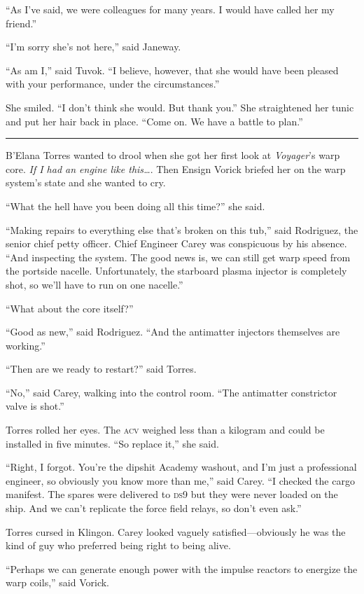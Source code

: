 \documentclass[twoside,letterpaper,12pt]{memoir}
\begin{document}
``As I've said, we were colleagues for many years. I would have called her my friend.''

``I'm sorry she's not here,'' said Janeway.

``As am I,'' said Tuvok. ``I believe, however, that she would have been pleased with your performance, under the circumstances.''

She smiled. ``I don't think she would. But thank you.'' She straightened her tunic and put her hair back in place. ``Come on. We have a battle to plan.''

\fancybreak{\rule{3cm}{0.4 pt}}
B'Elana Torres wanted to drool when she got her first look at \textit{Voyager}'s warp core. \textit{If I had an engine like this\ldots }. Then Ensign Vorick briefed her on the warp system's state and she wanted to cry.

``What the hell have you been doing all this time?'' she said.

``Making repairs to everything else that's broken on this tub,'' said Rodriguez, the senior chief petty officer. Chief Engineer Carey was conspicuous by his absence. ``And inspecting the system. The good news is, we can still get warp speed from the portside nacelle. Unfortunately, the starboard plasma injector is completely shot, so we'll have to run on one nacelle.''

``What about the core itself?''

``Good as new,'' said Rodriguez. ``And the antimatter injectors themselves are working.''

``Then are we ready to restart?'' said Torres.

``No,'' said Carey, walking into the control room. ``The antimatter constrictor valve is shot.''

Torres rolled her eyes. The \textsc{acv} weighed less than a kilogram and could be installed in five minutes. ``So replace it,'' she said.

``Right, I forgot. You're the dipshit Academy washout, and I'm just a professional engineer, so obviously you know more than me,'' said Carey. ``I checked the cargo manifest. The spares were delivered to \textsc{ds9} but they were never loaded on the ship. And we can't replicate the force field relays, so don't even ask.''

Torres cursed in Klingon. Carey looked vaguely satisfied---obviously he was the kind of guy who preferred being right to being alive.

``Perhaps we can generate enough power with the impulse reactors to energize the warp coils,'' said Vorick.
\end{document}
